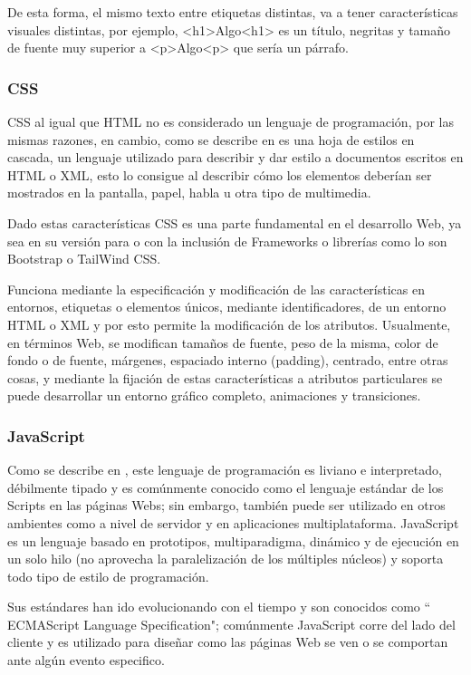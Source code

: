  De esta forma, el mismo texto entre etiquetas distintas, va a tener características
 visuales distintas, por ejemplo, <h1>Algo<h1> es un título, negritas y tamaño de
 fuente muy superior a <p>Algo<p> que sería un párrafo.


\subsubsection{CSS}

CSS al igual que HTML no es considerado un lenguaje de programación, por las mismas
razones, en cambio, como se describe en \textcite{CSS} es una hoja de estilos en cascada,
un lenguaje utilizado para describir y dar estilo a documentos escritos en HTML o
XML, esto lo consigue al describir cómo los elementos deberían ser mostrados en la
pantalla, papel, habla u otra tipo de multimedia.

Dado estas características CSS es una parte fundamental en el desarrollo Web, ya
sea en su versión para o con la inclusión de Frameworks o librerías como lo son
Bootstrap o TailWind CSS.

Funciona mediante la especificación y modificación de las características en
entornos, etiquetas o elementos únicos, mediante identificadores, de un entorno
HTML o XML y por esto permite la modificación de los atributos.
Usualmente, en términos Web, se modifican tamaños de fuente, peso de la misma,
color de fondo o de fuente, márgenes, espaciado interno (padding), centrado,
entre otras cosas, y mediante la fijación de estas características a atributos
particulares se puede desarrollar un entorno gráfico completo, animaciones y
transiciones.

\subsubsection{JavaScript}

Como se describe en \textcite{JavaScript}, este lenguaje de programación es liviano e
interpretado, débilmente tipado y es comúnmente conocido como el lenguaje estándar
de los Scripts en las páginas Webs; sin embargo, también puede ser utilizado en
otros ambientes como a nivel de servidor y en aplicaciones multiplataforma.
JavaScript es un lenguaje basado en prototipos, multiparadigma, dinámico y de
ejecución en un solo hilo (no aprovecha la paralelización de los múltiples
núcleos) y soporta todo tipo de estilo de programación.

Sus estándares han ido evolucionando con el tiempo y son conocidos como
`` ECMAScript Language Specification"; comúnmente JavaScript corre del lado del
cliente y es utilizado para diseñar como las páginas Web se ven o se comportan
ante algún evento especifico.

